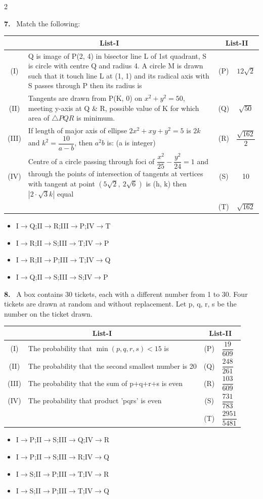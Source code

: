 \documentclass[10pt]{extarticle}
\newcommand{\qn}[1]{\par\smallskip\noindent\textbf{#1.}~}
\newenvironment{qoptions}{\begin{itemize}[leftmargin=1.8em,itemsep=1pt,topsep=2pt,label={}]}{\end{itemize}}
\newcommand{\opt}[2]{\item[(#1)] #2}
\begin{document}
\begin{multicols}{2}
\qn{7} Match the following:
\begin{center}
\begin{tabular}{|c|p{4.5cm}|c|c|}
\hline
\multicolumn{2}{|c|}{List-I} & \multicolumn{2}{c|}{List-II} \\
\hline
(I) & Q is image of P(2, 4) in bisector line L of 1st quadrant, S is circle with centre Q and radius 4. A circle M is drawn such that it touch line L at (1, 1) and its radical axis with S passes through P then its radius is & (P) & $12\sqrt2$ \\
\hline
(II) & Tangents are drawn from P(K, 0) on $x^2+y^2=50$, meeting y-axis at Q \& R, possible value of K for which area of $\triangle PQR$ is minimum. & (Q) & $\sqrt{50}$ \\
\hline
(III) & If length of major axis of ellipse $2x^2+xy+y^2=5$ is $2k$ and $k^2=\dfrac{10}{a-b}$, then $a^2b$ is: (a is integer) & (R) & $\dfrac{\sqrt{162}}{2}$ \\
\hline
(IV) & Centre of a circle passing through foci of $\dfrac{x^2}{25}-\dfrac{y^2}{24}=1$ and through the points of intersection of tangents at vertices with tangent at point $(5\sqrt2,\ 2\sqrt6)$ is (h, k) then $|2\cdot\sqrt3 k|$ equal & (S) & 10 \\
\hline
 & & (T) & $\sqrt{162}$ \\
\hline
\end{tabular}
\end{center}
\begin{qoptions}
\opt{A}{I$\to$Q;II$\to$R;III$\to$P;IV$\to$T}
\opt{B}{I$\to$R;II$\to$S;III$\to$T;IV$\to$P}
\opt{C}{I$\to$R;II$\to$P;III$\to$T;IV$\to$Q}
\opt{D}{I$\to$Q;II$\to$S;III$\to$S;IV$\to$P}
\end{qoptions}

\qn{8} A box contains 30 tickets, each with a different number from 1 to 30. Four tickets are drawn at random and without replacement. Let p, q, r, s be the number on the ticket drawn.
\begin{center}
\begin{tabular}{|c|p{4.3cm}|c|l|}
\hline
\multicolumn{2}{|c|}{List-I} & \multicolumn{2}{c|}{List-II} \\
\hline
(I) & The probability that $\min(p,q,r,s)<15$ is & (P) & $\dfrac{19}{609}$ \\
\hline
(II) & The probability that the second smallest number is 20 & (Q) & $\dfrac{248}{261}$ \\
\hline
(III) & The probability that the sum of p+q+r+s is even & (R) & $\dfrac{103}{609}$ \\
\hline
(IV) & The probability that product 'pqrs' is even & (S) & $\dfrac{731}{783}$ \\
\hline
 & & (T) & $\dfrac{2951}{5481}$ \\
\hline
\end{tabular}
\end{center}
\begin{qoptions}
\opt{A}{I$\to$P;II$\to$S;III$\to$Q;IV$\to$R}
\opt{B}{I$\to$P;II$\to$S;III$\to$R;IV$\to$Q}
\opt{C}{I$\to$S;II$\to$P;III$\to$T;IV$\to$R}
\opt{D}{I$\to$S;II$\to$P;III$\to$T;IV$\to$Q}
\end{qoptions}


\end{multicols}
\end{document}
